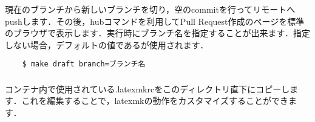 \documentclass[../main]{subfiles}
\begin{document}
\subsubsection{}

現在のブランチから新しいブランチを切り，空のcommitを行ってリモートへpushします．その後，hubコマンドを利用してPull Request作成のページを標準のブラウザで表示します．実行時にブランチ名を指定することが出来ます．指定しない場合，デフォルトの値であるが使用されます．

\begin{lstlisting}
    $ make draft branch=ブランチ名
\end{lstlisting}

\subsubsection{}
\label{sec:mklatexmkrc}

コンテナ内で使用されている.latexmkrcをこのディレクトリ直下にコピーします．これを編集することで，latexmkの動作をカスタマイズすることができます．
\end{document}
